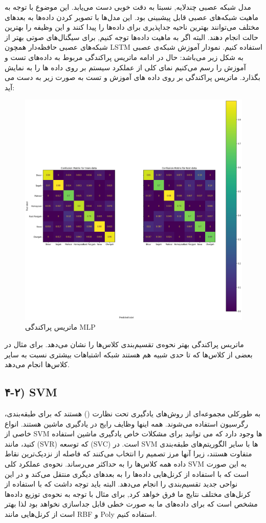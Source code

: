 \documentclass{article}
\begin{document}
\newline
مدل شبکه عصبی چندلایه, نسبتا به دقت خوبی دست می‌یابد. این موضوع با توجه به ماهیت شبکه‌های عصبی قابل پیشبینی بود. این مدل‌ها با تصویر کردن داده‌ها به بعد‌های مختلف می‌توانند بهترین ناحیه جداپذیری برای داده‌ها را پیدا کنند و این وظیفه را بهترین حالت انجام دهند.
البته اگر به ماهیت داده‌ها توجه کنیم, برای سیگنال‌های صوتی بهتر از شبکه‌های عصبی حافظه‌دار همچون LSTM استفاده کنیم.
نمودار آموزش شبکه‌ی عصبی به شکل زیر می‌باشد:‌
حال در ادامه ماتریس پراکندگی مربوط به داده‌های تست و آموزش را رسم می‌کنیم نمای کلی از عملکرد سیستم بر روی داده ها را به نمایش بگذارد.\newline
ماتریس پراکندگی بر روی داده های آموزش و تست به صورت زیر به دست می آید:
\newpage
\begin{figure}[h]
	\centering
	\includegraphics[width=0.7\linewidth]{Photo/111}
	\caption[ماتریس پراکندگی MLP]{ماتریس پراکندگی MLP}
	\label{fig:111}
\end{figure}
ماتریس پراکندگی بهتر نحوه‌ی تقسیم‌بندی کلاس‌ها را نشان می‌دهد. برای مثال در بعضی از کلاس‌ها که تا حدی شبیه هم هستند شبکه اشتباهات بیشتری نسبت به سایر کلاس‌ها انجام می‌دهد.

\subsection{۴-۲) SVM}
به طورکلی  مجموعه‌ای از روش‌های یادگیری تحت نظارت () هستند که برای طبقه‌بندی، رگرسیون استفاده می‌شوند. همه اینها وظایف رایج در یادگیری ماشین هستند.\newline
انواع خاصی از SVM ها وجود دارد که می توانید برای مشکلات خاص یادگیری ماشین استفاده کنید، مانند  (SVR) که توسعه  (SVC) است.\newline
در SVM ها با سایر الگوریتم‌های طبقه‌بندی متفاوت هستند، زیرا آنها مرز تصمیم را انتخاب می‌کنند که فاصله از نزدیک‌ترین نقاط داده همه کلاس‌ها را به حداکثر می‌رساند. \newline
نحوه‌ی عملکرد کلی SVM به این صورت است که با استفاده از کرنل‌هایی داده‌ها را به بعدهای دیگری منتقل می‌کند و در این نواحی جدید تقسیم‌بندی را انجام می‌دهد. البته باید توجه داشت که با استفاده از کرنل‌های مختلف نتایج ما فرق خواهد کرد, برای مثال با توجه به نحوه‌ی توزیع داده‌ها مشخص است که برای داده‌های ما به صورت خطی قابل جداسازی نخواهد بود لذا بهتر است از کرنل‌هایی مانند RBF و Poly استفاده کنیم.
\end{document}
